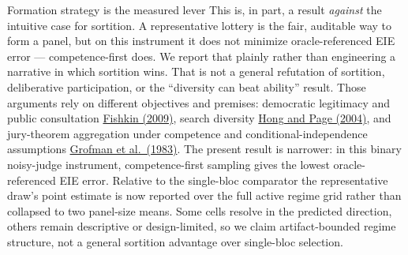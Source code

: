\documentclass[
  ignorenonframetext,
]{beamer}
\begin{document}
\begin{frame}[allowframebreaks]{Formation strategy is the measured
lever}
This is, in part, a result \emph{against} the intuitive case for
sortition. A representative lottery is the fair, auditable way to form a
panel, but on this instrument it does not minimize oracle-referenced EIE
error --- competence-first does. We report that plainly rather than
engineering a narrative in which sortition wins. That is not a general
refutation of sortition, deliberative participation, or the ``diversity
can beat ability'' result. Those arguments rely on different objectives
and premises: democratic legitimacy and public consultation
\href{https://global.oup.com/academic/product/when-the-people-speak-9780199604432}{Fishkin
(2009)}, search diversity
\href{https://doi.org/10.1073/pnas.0403723101}{Hong and Page (2004)},
and jury-theorem aggregation under competence and
conditional-independence assumptions
\href{https://doi.org/10.1007/BF00125672}{Grofman et al.~(1983)}. The
present result is narrower: in this binary noisy-judge instrument,
competence-first sampling gives the lowest oracle-referenced EIE error.
Relative to the single-bloc comparator the representative draw's point
estimate is now reported over the full active regime grid rather than
collapsed to two panel-size means. Some cells resolve in the predicted
direction, others remain descriptive or design-limited, so we claim
artifact-bounded regime structure, not a general sortition advantage
over single-bloc selection.
\end{frame}
\end{document}
